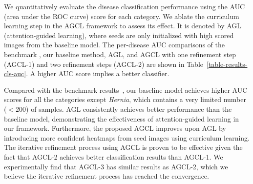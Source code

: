 \documentclass[runningheads,a4paper]{llncs}
\begin{document}
We quantitatively evaluate the disease classification performance using the AUC (area under the ROC curve) score for each category. We ablate the curriculum learning step in the AGCL framework to assess its effect. It is denoted by AGL (attention-guided learning), where seeds are only initialized with high scored images from the baseline model. The per-disease AUC comparisons of the benchmark \cite{Wang_CVPR2017}, our baseline method, AGL, and AGCL with one refinement step (AGCL-1) and two refinement steps (AGCL-2) are shown in Table~\ref{table-results-cls-auc}. A higher AUC score implies a better classifier.

Compared with the benchmark results~\cite{Wang_CVPR2017}, our baseline model achieves higher AUC scores for all the categories except \textit{Hernia}, which contains a very limited number ($<200$) of samples. AGL consistently achieves better performance than the baseline model, demonstrating the effectiveness of attention-guided learning in our framework. Furthermore, the proposed AGCL improves upon AGL by introducing more confident heatmaps from seed images using curriculum learning. The iterative refinement process using AGCL is proven to be effective given the fact that AGCL-2 achieves better classification results than AGCL-1. We experimentally find that AGCL-3 has similar results as AGCL-2, which we believe the iterative refinement process has reached the convergence.
\end{document}
